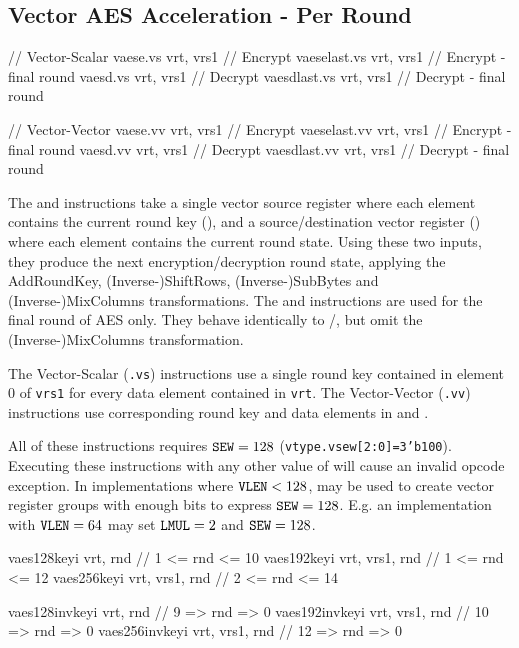 
\subsection{Vector AES Acceleration - Per Round}
\label{sec:vector:aes:single-round}

\begin{cryptoisa}
// Vector-Scalar
vaese.vs        vrt, vrs1        // Encrypt
vaeselast.vs    vrt, vrs1        // Encrypt - final round
vaesd.vs        vrt, vrs1        // Decrypt
vaesdlast.vs    vrt, vrs1        // Decrypt - final round

// Vector-Vector
vaese.vv        vrt, vrs1        // Encrypt
vaeselast.vv    vrt, vrs1        // Encrypt - final round
vaesd.vv        vrt, vrs1        // Decrypt
vaesdlast.vv    vrt, vrs1        // Decrypt - final round
\end{cryptoisa}

The  and  instructions take
a single vector source register where each element contains the
current round key (),
and
a source/destination vector register (\vrt) where each element contains
the current round state.
Using these two inputs, they produce the next encryption/decryption
round state, applying the 
AddRoundKey, (Inverse-)ShiftRows, (Inverse-)SubBytes and (Inverse-)MixColumns
transformations.
The  and  instructions
are used for the final round of AES only.
They behave identically to /, but
omit the (Inverse-)MixColumns transformation.

The Vector-Scalar ({\tt *.vs}) instructions use a single round key
contained in element $0$ of {\tt vrs1} for every data element
contained in {\tt vrt}.
The Vector-Vector ({\tt *.vv}) instructions use corresponding
round key and data elements in  and \vrt.

All of these instructions requires ${\tt SEW}=128$
({\tt vtype.vsew[2:0]=3'b100}).
Executing these instructions with any other value of \SEW will cause
an invalid opcode exception.
In implementations where ${\tt VLEN}<128$, \LMUL may be used to create
vector register groups with enough bits to express ${\tt SEW}=128$.
E.g. an implementation with ${\tt VLEN}=64$ may set ${\tt LMUL}=2$ and ${\tt SEW}=128$.

\begin{cryptoisa}
vaes128keyi     vrt,       rnd    // 1  <= rnd <= 10
vaes192keyi     vrt, vrs1, rnd    // 1  <= rnd <= 12
vaes256keyi     vrt, vrs1, rnd    // 2  <= rnd <= 14

vaes128invkeyi  vrt,       rnd    // 9  => rnd =>  0
vaes192invkeyi  vrt, vrs1, rnd    // 10 => rnd =>  0
vaes256invkeyi  vrt, vrs1, rnd    // 12 => rnd =>  0
\end{cryptoisa}

